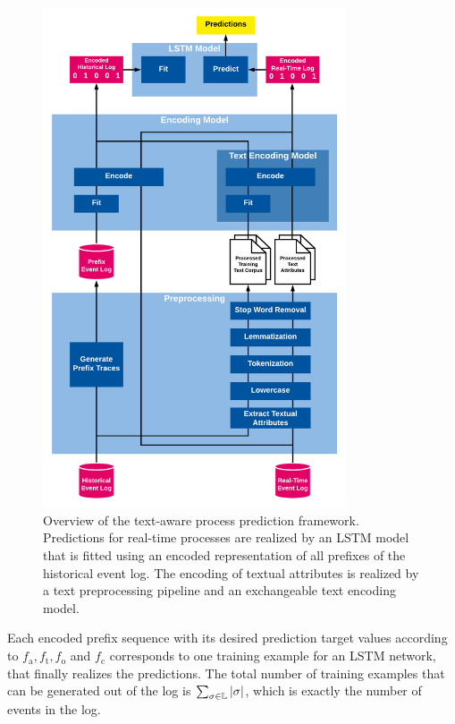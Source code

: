 \begin{figure}[!htbp]
	\centering
	\includegraphics[width=0.8\textwidth]{figures/framework}
	\caption[Overview of the text-aware process prediction framework]{Overview of the text-aware process prediction framework. Predictions for real-time processes are realized by an LSTM model that is fitted using an encoded representation of all prefixes of the historical event log. The encoding of textual attributes is realized by a text preprocessing pipeline and an exchangeable text encoding model.}
	\label{fig:framework}
\end{figure}

Each encoded prefix sequence with its desired prediction target values according to $f_\mathrm{a}, f_\mathrm{t}, f_\mathrm{o}$ and $f_\mathrm{c}$ corresponds to one training example for an LSTM network, that finally realizes the predictions. 
The total number of training examples that can be generated out of the log is $\sum_{\sigma \in \mathbb{L}}|\sigma|$, which is exactly the number of events in the log.


